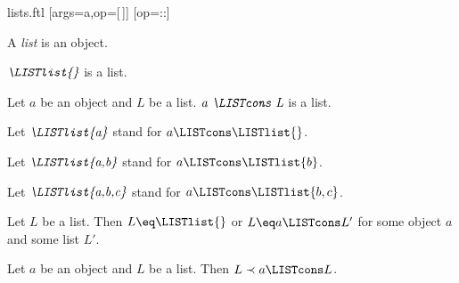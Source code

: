 \documentclass{naproche-library}
\begin{document}
\begin{smodule}[title=Lists]{lists.ftl}
[args=a,op=[\,]]{}
[op=::]{\mathbin{\highlight{::}}}

\begin{signature}[forthel,id=LISTS_LISTS_4578620297183232]
  A \emph{list} is an object.
\end{signature}

\begin{signature}[forthel,id=LISTS_LISTS_3703161885818880]
  $\emph{\LISTlist{}}$ is a list.
\end{signature}

\begin{signature}[forthel,id=LISTS_LISTS_8050301789536256]
  Let $a$ be an object and $L$ be a list.
  $\emph{a \LISTcons L}$ is a list.

  Let $\emph{\LISTlist{a}}$ stand for $a \LISTcons \LISTlist{}$.
  
  Let $\emph{\LISTlist{a,b}}$ stand for $a \LISTcons \LISTlist{b}$.
  
  Let $\emph{\LISTlist{a,b,c}}$ stand for $a \LISTcons \LISTlist{b,c}$.
\end{signature}

\begin{axiom}[forthel,id=LISTS_LISTS_4512036658964875]
  Let $L$ be a list.
  Then $L \eq \LISTlist{}$ or $L \eq a \LISTcons L'$ for some object $a$ and some list $L'$.
\end{axiom}

\begin{axiom}[forthel,id=LISTS_LISTS_1021563255448756]
  Let $a$ be an object and $L$ be a list.
  Then $L \prec a \LISTcons L$.
\end{axiom}
\end{smodule}
\end{document}
